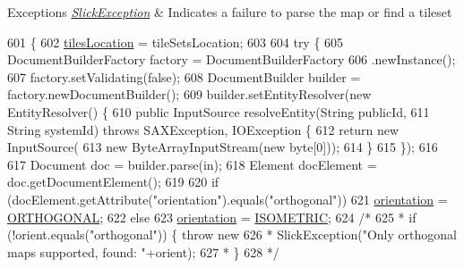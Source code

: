 \begin{DoxyExceptions}{Exceptions}
{\em \mbox{\hyperlink{classorg_1_1newdawn_1_1slick_1_1_slick_exception}{Slick\+Exception}}} & Indicates a failure to parse the map or find a tileset \\
\hline
\end{DoxyExceptions}

\begin{DoxyCode}
601                                   \{
602         \mbox{\hyperlink{classorg_1_1newdawn_1_1slick_1_1tiled_1_1_tiled_map_ad72e470aa9510074aae12dab7968ec1f}{tilesLocation}} = tileSetsLocation;
603 
604         \textcolor{keywordflow}{try} \{
605             DocumentBuilderFactory factory = DocumentBuilderFactory
606                     .newInstance();
607             factory.setValidating(\textcolor{keyword}{false});
608             DocumentBuilder builder = factory.newDocumentBuilder();
609             builder.setEntityResolver(\textcolor{keyword}{new} EntityResolver() \{
610                 \textcolor{keyword}{public} InputSource resolveEntity(String publicId,
611                         String systemId) \textcolor{keywordflow}{throws} SAXException, IOException \{
612                     \textcolor{keywordflow}{return} \textcolor{keyword}{new} InputSource(
613                             \textcolor{keyword}{new} ByteArrayInputStream(\textcolor{keyword}{new} byte[0]));
614                 \}
615             \});
616 
617             Document doc = builder.parse(in);
618             Element docElement = doc.getDocumentElement();
619 
620             \textcolor{keywordflow}{if} (docElement.getAttribute(\textcolor{stringliteral}{"orientation"}).equals(\textcolor{stringliteral}{"orthogonal"}))
621                 \mbox{\hyperlink{classorg_1_1newdawn_1_1slick_1_1tiled_1_1_tiled_map_a2985b80667928eae97e82ecad9e4432c}{orientation}} = \mbox{\hyperlink{classorg_1_1newdawn_1_1slick_1_1tiled_1_1_tiled_map_aee2ab711fd19bcd0a1977fe0895607bb}{ORTHOGONAL}};
622             \textcolor{keywordflow}{else}
623                 \mbox{\hyperlink{classorg_1_1newdawn_1_1slick_1_1tiled_1_1_tiled_map_a2985b80667928eae97e82ecad9e4432c}{orientation}} = \mbox{\hyperlink{classorg_1_1newdawn_1_1slick_1_1tiled_1_1_tiled_map_abe8c8af0eeec35e4533db6fab4d53cba}{ISOMETRIC}};
624             \textcolor{comment}{/*}
625 \textcolor{comment}{             * if (!orient.equals("orthogonal")) \{ throw new}
626 \textcolor{comment}{             * SlickException("Only orthogonal maps supported, found: "+orient);}
627 \textcolor{comment}{             * \}}
628 \textcolor{comment}{             */}

\end{DoxyCode}
